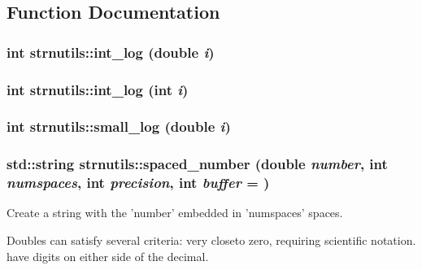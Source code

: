 \subsection{Function Documentation}
\hypertarget{namespacestrnutils_a824998df37bca6b260b9829e9a8a469d}{
\subsubsection[{int\_\-log}]{\setlength{\rightskip}{0pt plus 5cm}int strnutils::int\_\-log (double {\em i})}}
\label{namespacestrnutils_a824998df37bca6b260b9829e9a8a469d}
\hypertarget{namespacestrnutils_a997ca9ec4292378552d7dc0a4ff5c78f}{
\subsubsection[{int\_\-log}]{\setlength{\rightskip}{0pt plus 5cm}int strnutils::int\_\-log (int {\em i})}}
\label{namespacestrnutils_a997ca9ec4292378552d7dc0a4ff5c78f}
\hypertarget{namespacestrnutils_a9626f017ab7690de87b8c154b9acd426}{
\subsubsection[{small\_\-log}]{\setlength{\rightskip}{0pt plus 5cm}int strnutils::small\_\-log (double {\em i})}}
\label{namespacestrnutils_a9626f017ab7690de87b8c154b9acd426}
\hypertarget{namespacestrnutils_a68527d204971afac794cff1d78e3556f}{
\subsubsection[{spaced\_\-number}]{\setlength{\rightskip}{0pt plus 5cm}std::string strnutils::spaced\_\-number (double {\em number}, \/  int {\em numspaces}, \/  int {\em precision}, \/  int {\em buffer} = {})}}
\label{namespacestrnutils_a68527d204971afac794cff1d78e3556f}
Create a string with the 'number' embedded in 'numspaces' spaces.

Doubles can satisfy several criteria: very closeto zero, requiring scientific notation. have digits on either side of the decimal.


